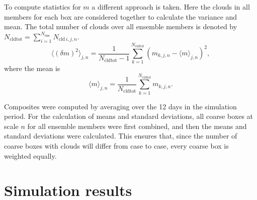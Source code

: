 \documentclass[a4paper, 12pt]{article}
\begin{document}
To compute statistics for $m$ a different approach is taken. Here the clouds in all members for each box are considered together to calculate the variance and mean. The total number of clouds over all ensemble members is denoted by $N_{\mathrm{cldtot}} = \sum_{i=1}^{N_{\mathrm{ens}}} N_{\mathrm{cld}\,i,j,n}$.
\begin{equation} \label{eq:calc_varm}
 \langle (\delta m )^2 \rangle_{j,n} = \frac{1}{N_{\mathrm{cldtot}}-1} \sum_{k=1}^{N_{\mathrm{cldtot}}} (m_{k,j,n} - \langle m \rangle_{j,n})^2,
\end{equation}
where the mean is
\begin{equation} \label{eq:calc_meanm}
 \langle m \rangle_{j,n} = \frac{1}{N_{\mathrm{cldtot}}} \sum_{k=1}^{N_{\mathrm{cldtot}}} m_{k,j,n}.
\end{equation}
% 

Composites were computed by averaging over the 12 days in the simulation period. For the calculation of means and standard deviations, all coarse boxes at scale $n$ for all ensemble members were first combined, and then the means and standard deviations were calculated. This ensures that, since the number of coarse boxes with clouds will differ from case to case, every coarse box is weighted equally.


\section{Simulation results} \label{sec:results}
\end{document}
